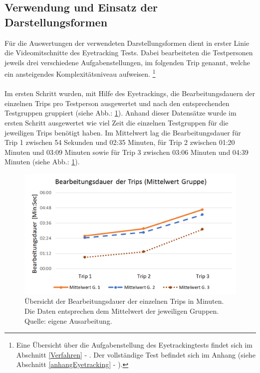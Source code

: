 \documentclass[Bachelorarbeit.tex]{subfiles}
\begin{document}
\subsection{Verwendung und Einsatz der Darstellungsformen}
\label{ergebnis_darstellungsformen}
Für die Auswertungen der verwendeten Darstellungsformen dient in erster Linie die Videomitschnitte des Eyetracking Tests. 
Dabei bearbeiteten die Testpersonen jeweils drei verschiedene Aufgabenstellungen, im folgenden Trip genannt, welche ein ansteigendes Komplexitätsniveau aufweisen.
\footnote{Eine Übersicht über die Aufgabenstellung des Eyetrackingtests findet sich im Abschnitt \ref{Verfahren} - . Der vollständige Test befindet sich im Anhang (siehe Abschnitt \ref{anhangEyetracking} - ). 
	}\\
	\\
Im ersten Schritt wurden, mit Hilfe des Eyetrackings, die Bearbeitungsdauern der einzelnen Trips pro Testperson ausgewertet und nach den entsprechenden Testgruppen gruppiert (siehe Abb.: \ref{fig:BearbeitungsdauerTrip}).  
Anhand dieser Datensätze wurde im ersten Schritt ausgewertet wie viel Zeit die einzelnen Testgruppen für die jeweiligen Trips benötigt haben.
Im Mittelwert lag die Bearbeitungsdauer für Trip 1 zwischen 54 Sekunden und 02:35 Minuten, für Trip 2 zwischen 01:20 Minuten und 03:09 Minuten sowie für Trip 3 zwischen 03:06 Minuten und 04:39 Minuten (siehe Abb.: \ref{fig:BearbeitungsdauerTrip}).
\begin{figure}[H]
\centering
\includegraphics[width=0.7\linewidth]{img/Evaluation/Darstellungsformen/BearbeitungsdauerTrip}
\caption[Übersicht der Bearbeitungsdauer]{Übersicht der Bearbeitungsdauer der einzelnen Trips in Minuten. Die Daten entsprechen dem Mittelwert der jeweiligen Gruppen.  
Quelle: eigene Ausarbeitung.
	}
\label{fig:BearbeitungsdauerTrip}
\end{figure}
\end{document}
